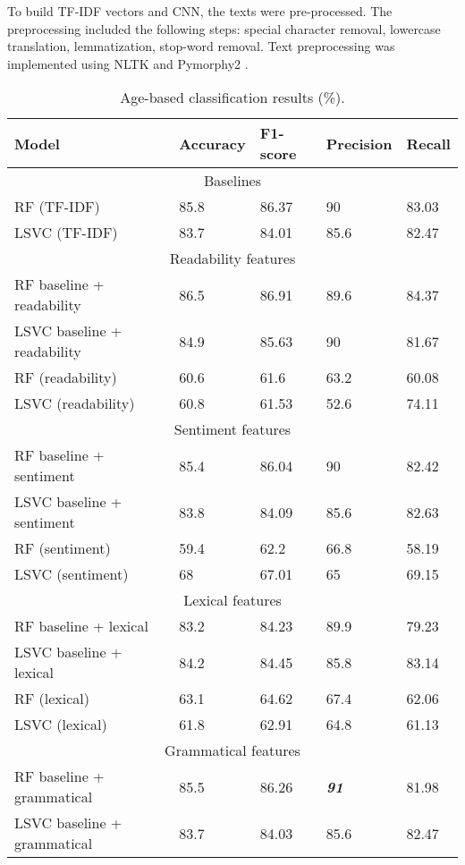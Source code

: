 \documentclass[runningheads]{llncs}
\begin{document}
To build TF-IDF vectors and CNN, the texts were pre-processed. The preprocessing included the following steps: special character removal, lowercase translation, lemmatization, stop-word removal. Text preprocessing was implemented using NLTK \cite{NLTK} and Pymorphy2 \cite{pymorphy2}.

\begin{table}[htbp]
\caption{Age-based classification results (\%).}\label{tab4}
\begin{tabular}{|l|l|l|l|l|}
\hline
Model & Accuracy & F1-score & Precision & Recall \\ \hline
\multicolumn{5}{|c|}{Baselines} \\ \hline
RF (TF-IDF) & 85.8 & 86.37 & 90 & 83.03 \\ 
LSVC (TF-IDF) & 83.7 & 84.01 & 85.6 & 82.47 \\ \hline
\multicolumn{5}{|c|}{Readability features} \\ \hline
RF baseline + readability & 86.5 & 86.91 & 89.6 & 84.37 \\ 
LSVC baseline + readability & 84.9 & 85.63 & 90 & 81.67 \\ 
RF (readability) & 60.6 & 61.6 & 63.2 & 60.08 \\ 
LSVC (readability) & 60.8 & 61.53 & 52.6 & 74.11 \\ \hline
\multicolumn{5}{|c|}{Sentiment features} \\ \hline
RF baseline + sentiment & 85.4 & 86.04 & 90 & 82.42 \\ 
LSVC baseline + sentiment & 83.8 & 84.09 & 85.6 & 82.63 \\ 
RF (sentiment) & 59.4 & 62.2 & 66.8 & 58.19 \\ 
LSVC (sentiment) & 68 & 67.01 & 65 & 69.15 \\ \hline
\multicolumn{5}{|c|}{Lexical features} \\ \hline
RF baseline + lexical & 83.2 & 84.23 & 89.9 & 79.23 \\ 
LSVC baseline + lexical & 84.2 & 84.45 & 85.8 & 83.14 \\ 
RF (lexical) & 63.1 & 64.62 & 67.4 & 62.06 \\ 
LSVC (lexical) & 61.8 & 62.91 & 64.8 & 61.13 \\ \hline
\multicolumn{5}{|c|}{Grammatical features} \\ \hline
RF baseline + grammatical & 85.5 & 86.26 & \textit{\textbf{91}} & 81.98 \\ 
LSVC baseline + grammatical & 83.7 & 84.03 & 85.6 & 82.47 \\ 

\end{tabular}
\end{table}
\end{document}
